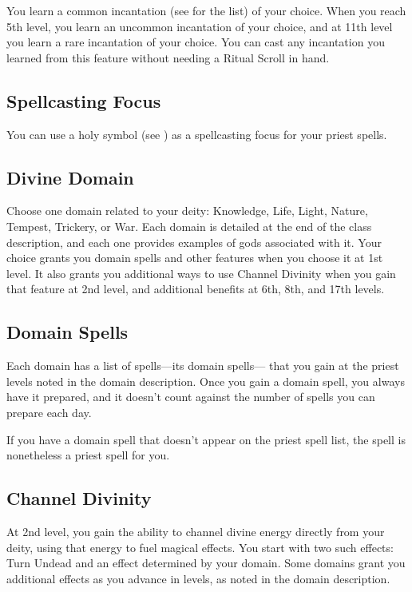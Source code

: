 You learn a common incantation (see  for the list) of your choice. When you reach 5th level, you learn an uncommon incantation of your choice, and at 11th level you learn a rare incantation of your choice. You can cast any incantation you learned from this feature without needing a Ritual Scroll in hand.

\subsection{Spellcasting Focus}

You can use a holy symbol (see ) as a spellcasting focus for your priest spells.

\subsection{Divine Domain}

Choose one domain related to your deity: Knowledge, Life, Light, Nature, Tempest, Trickery, or War. Each domain is detailed at the end of the class description, and each one provides examples of gods associated with it. Your choice grants you domain spells and other features when you choose it at 1st level. It also grants you additional ways to use Channel Divinity when you gain that feature at 2nd level, and additional benefits at 6th, 8th, and 17th levels.

\subsection{Domain Spells}

Each domain has a list of spells—its domain spells— that you gain at the priest levels noted in the domain description. Once you gain a domain spell, you always have it prepared, and it doesn't count against the number of spells you can prepare each day.

If you have a domain spell that doesn't appear on the priest spell list, the spell is nonetheless a priest spell for you.

\subsection{Channel Divinity}

At 2nd level, you gain the ability to channel divine energy directly from your deity, using that energy to fuel magical effects. You start with two such effects: Turn Undead and an effect determined by your domain. Some domains grant you additional effects as you advance in levels, as noted in the domain description.

